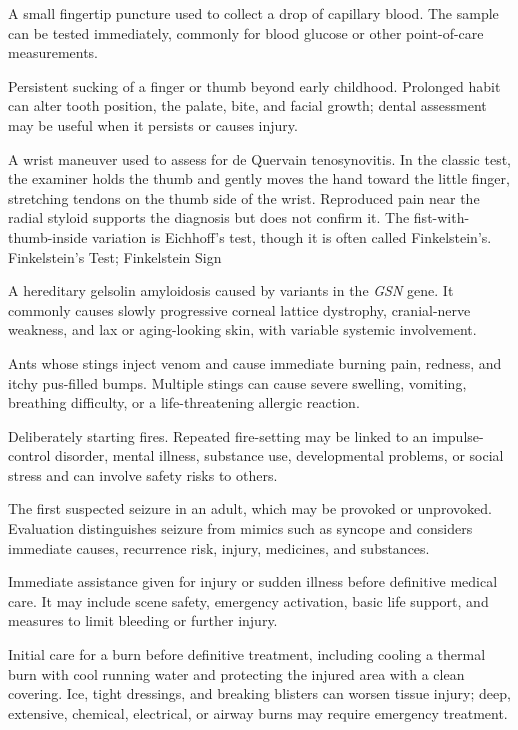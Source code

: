  A small fingertip puncture used to collect a drop of capillary blood. The sample can be tested immediately, commonly for blood glucose or other point-of-care measurements.

 Persistent sucking of a finger or thumb beyond early childhood. Prolonged habit can alter tooth position, the palate, bite, and facial growth; dental assessment may be useful when it persists or causes injury.

 A wrist maneuver used to assess for de Quervain tenosynovitis.
In the classic test, the examiner holds the thumb and gently moves the hand toward the
little finger, stretching tendons on the thumb side of the wrist. Reproduced pain near the
radial styloid supports the diagnosis but does not confirm it. The fist-with-thumb-inside
variation is Eichhoff's test, though it is often called Finkelstein's.
\synonyms
Finkelstein's Test; Finkelstein Sign

 A hereditary gelsolin amyloidosis caused by variants in the \textit{GSN} gene. It commonly causes slowly progressive corneal lattice dystrophy, cranial-nerve weakness, and lax or aging-looking skin, with variable systemic involvement.

 Ants whose stings inject venom and cause immediate burning pain, redness, and itchy pus-filled bumps. Multiple stings can cause severe swelling, vomiting, breathing difficulty, or a life-threatening allergic reaction.

 Deliberately starting fires. Repeated fire-setting may be linked to an impulse-control disorder, mental illness, substance use, developmental problems, or social stress and can involve safety risks to others.

 The first suspected seizure in an adult, which may be provoked or unprovoked. Evaluation distinguishes seizure from mimics such as syncope and considers immediate causes, recurrence risk, injury, medicines, and substances.

 Immediate assistance given for injury or sudden illness before definitive medical care. It may include scene safety, emergency activation, basic life support, and measures to limit bleeding or further injury.

 Initial care for a burn before definitive treatment, including cooling a thermal burn with cool running water and protecting the injured area with a clean covering. Ice, tight dressings, and breaking blisters can worsen tissue injury; deep, extensive, chemical, electrical, or airway burns may require emergency treatment.

